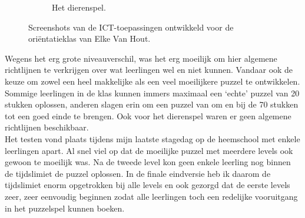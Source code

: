 \documentclass[a4paper,11pt]{article}
\theoremstyle{definition}
\begin{document}
\begin{figure}[h!]
\begin{subfigure}{1\textwidth}
                \caption{Het dierenspel.}
                \label{dieren}
        \end{subfigure}
           \caption{Screenshots van de ICT-toepassingen ontwikkeld voor de oriëntatieklas van Elke Van Hout.}
\end{figure}
Wegens het erg grote niveauverschil, was het erg moeilijk om hier algemene 
richtlijnen te verkrijgen over wat leerlingen wel en niet kunnen. Vandaar ook de 
keuze om zowel een heel makkelijke als een veel moeilijkere puzzel te 
ontwikkelen. Sommige leerlingen in de klas kunnen immers maximaal een `echte' puzzel van 
20 stukken oplossen, anderen slagen erin om een puzzel van om en bij de 70 
stukken tot een goed einde te brengen. Ook voor het dierenspel waren er geen 
algemene richtlijnen beschikbaar.\\

\noindent Het testen vond plaats tijdens mijn laatste stagedag op de 
heemschool met enkele leerlingen apart. Al snel viel op dat de moeilijke puzzel 
met meerdere levels ook gewoon te moeilijk was. Na de tweede level kon geen 
enkele leerling nog binnen de tijdslimiet de puzzel oplossen. In de finale 
eindversie heb ik daarom de tijdslimiet enorm opgetrokken bij alle levels en ook 
gezorgd dat de eerste levels zeer, zeer eenvoudig beginnen zodat alle leerlingen 
toch een redelijke vooruitgang in het puzzelspel kunnen boeken. \\
\end{document}
